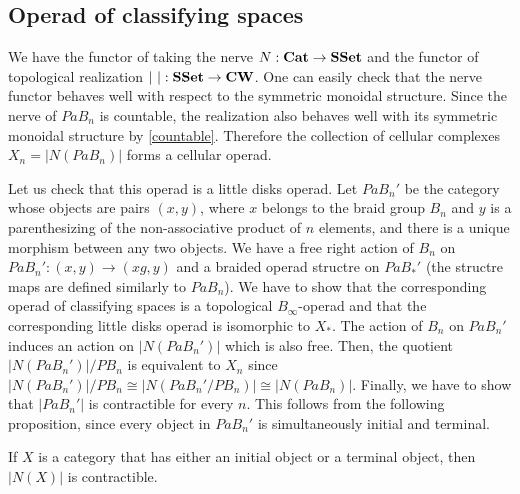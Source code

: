 \documentclass[TFM.tex]{subfiles}
\begin{document}
\subsection{Operad of classifying spaces}

We have the functor of taking the nerve $N:\mathrm{\mathbf{Cat}}\to\mathrm{\mathbf{SSet}}$ and the functor of topological realization $|\ |:\mathrm{\mathbf{SSet}}\to \mathrm{\mathbf{CW}}$. One can easily check that the nerve functor behaves well with respect to the symmetric monoidal structure. Since the nerve of $PaB_n$ is countable, the realization also behaves well with its symmetric monoidal structure by \ref{countable}. Therefore the collection of cellular complexes $X_n=|N(PaB_n)|$ forms a cellular operad. 

Let us check that this operad is a little disks operad. Let $PaB_n'$ be the category whose objects are pairs $(x,y)$, where $x$ belongs to the braid group $B_n$ and $y$ is a parenthesizing of the non-associative product of $n$ elements, and there is a unique morphism between any two objects. We have a free right action of $B_n$ on $PaB_n':(x,y)\to (xg,y)$ and a braided operad structre on $PaB_*'$ (the structre maps are defined similarly to $PaB_n$). %
We have to show that the corresponding operad of classifying spaces is a topological $B_\infty$-operad and that the corresponding little disks operad is isomorphic to $X_*$. The action of $B_n$ on $PaB_n'$ induces an action on $|N(PaB_n')|$ which is also free.  %
 Then, the quotient $|N(PaB_n')|/PB_n$ is equivalent to $X_n$ since $|N(PaB_n')|/PB_n\cong |N(PaB_n'/PB_n)|\cong |N(PaB_n)|$. %
 Finally, we have to show that $|PaB_n'|$ is contractible for every $n$. This follows from the following proposition, since every object in $PaB_n'$ is simultaneously initial and terminal. %
\begin{prop}
	If $X$ is a category that has either an initial object or a terminal object, then $|N(X)|$ is contractible.
\end{prop}
\end{document}
